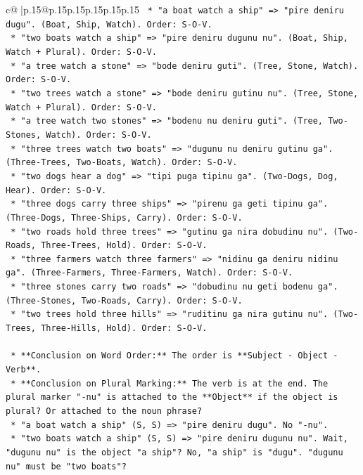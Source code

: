 \documentclass{article}
\begin{document}
{\begin{supertabular}{c@{$\;$}|p{.15\linewidth}@{}p{.15\linewidth}p{.15\linewidth}p{.15\linewidth}p{.15\linewidth}p{.15\linewidth}}
{{{\texttt{        *   "a boat watch a ship" => "pire deniru dugu". (Boat, Ship, Watch). Order: S{-}O{-}V.} \\
\texttt{        *   "two boats watch a ship" => "pire deniru dugunu nu". (Boat, Ship, Watch + Plural). Order: S{-}O{-}V.} \\
\texttt{        *   "a tree watch a stone" => "bode deniru guti". (Tree, Stone, Watch). Order: S{-}O{-}V.} \\
\texttt{        *   "two trees watch a stone" => "bode deniru gutinu nu". (Tree, Stone, Watch + Plural). Order: S{-}O{-}V.} \\
\texttt{        *   "a tree watch two stones" => "bodenu nu deniru guti". (Tree, Two{-}Stones, Watch). Order: S{-}O{-}V.} \\
\texttt{        *   "three trees watch two boats" => "dugunu nu deniru gutinu ga". (Three{-}Trees, Two{-}Boats, Watch). Order: S{-}O{-}V.} \\
\texttt{        *   "two dogs hear a dog" => "tipi puga tipinu ga". (Two{-}Dogs, Dog, Hear). Order: S{-}O{-}V.} \\
\texttt{        *   "three dogs carry three ships" => "pirenu ga geti tipinu ga". (Three{-}Dogs, Three{-}Ships, Carry). Order: S{-}O{-}V.} \\
\texttt{        *   "two roads hold three trees" => "gutinu ga nira dobudinu nu". (Two{-}Roads, Three{-}Trees, Hold). Order: S{-}O{-}V.} \\
\texttt{        *   "three farmers watch three farmers" => "nidinu ga deniru nidinu ga". (Three{-}Farmers, Three{-}Farmers, Watch). Order: S{-}O{-}V.} \\
\texttt{        *   "three stones carry two roads" => "dobudinu nu geti bodenu ga". (Three{-}Stones, Two{-}Roads, Carry). Order: S{-}O{-}V.} \\
\texttt{        *   "two trees hold three hills" => "ruditinu ga nira gutinu nu". (Two{-}Trees, Three{-}Hills, Hold). Order: S{-}O{-}V.} \\
\\ 
\texttt{    *   **Conclusion on Word Order:** The order is **Subject {-} Object {-} Verb**.} \\
\texttt{    *   **Conclusion on Plural Marking:** The verb is at the end. The plural marker "{-}nu" is attached to the **Object** if the object is plural? Or attached to the noun phrase?} \\
\texttt{        *   "a boat watch a ship" (S, S) => "pire deniru dugu". No "{-}nu".} \\
\texttt{        *   "two boats watch a ship" (S, S) => "pire deniru dugunu nu". Wait, "dugunu nu" is the object "a ship"? No, "a ship" is "dugu". "dugunu nu" must be "two boats"?} \\
}}}
\end{supertabular}}
\end{document}
